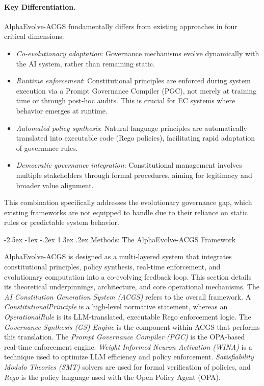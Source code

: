 \documentclass[manuscript,screen,review,anonymous,9pt]{acmart}
\makeatletter
\renewcommand\section{\@startsection{section}{1}{\z@}%
  {-2.5ex \@plus -1ex \@minus -.2ex}%
  {1.3ex \@plus.2ex}%
  {\normalfont\Large\bfseries}}
\makeatother
\begin{document}
\paragraph{Key Differentiation.} AlphaEvolve-ACGS fundamentally differs from existing approaches in four critical dimensions:
\begin{itemize}[leftmargin=*,itemsep=1pt,parsep=1pt]
    \item \textit{Co-evolutionary adaptation}: Governance mechanisms evolve dynamically with the AI system, rather than remaining static.
    \item \textit{Runtime enforcement}: Constitutional principles are enforced during system execution via a Prompt Governance Compiler (PGC), not merely at training time or through post-hoc audits. This is crucial for EC systems where behavior emerges at runtime.
    \item \textit{Automated policy synthesis}: Natural language principles are automatically translated into executable code (Rego policies), facilitating rapid adaptation of governance rules.
    \item \textit{Democratic governance integration}: Constitutional management involves multiple stakeholders through formal procedures, aiming for legitimacy and broader value alignment.
\end{itemize}
This combination specifically addresses the evolutionary governance gap, which existing frameworks are not equipped to handle due to their reliance on static rules or predictable system behavior.

\section{Methods: The AlphaEvolve-ACGS Framework}
\label{sec:methods}

AlphaEvolve-ACGS is designed as a multi-layered system that integrates constitutional principles, policy synthesis, real-time enforcement, and evolutionary computation into a co-evolving feedback loop. This section details its theoretical underpinnings, architecture, and core operational mechanisms. The \textit{AI Constitution Generation System (ACGS)} refers to the overall framework. A \textit{ConstitutionalPrinciple} is a high-level normative statement, whereas an \textit{OperationalRule} is its LLM-translated, executable Rego enforcement logic. The \textit{Governance Synthesis (GS) Engine} is the component within ACGS that performs this translation. The \textit{Prompt Governance Compiler (PGC)} is the OPA-based real-time enforcement engine. \textit{Weight Informed Neuron Activation (WINA)} \cite{WINA2024NeuronActivation} is a technique used to optimize LLM efficiency and policy enforcement. \textit{Satisfiability Modulo Theories (SMT)} solvers are used for formal verification of policies, and \textit{Rego} is the policy language used with the Open Policy Agent (OPA).
\end{document}
